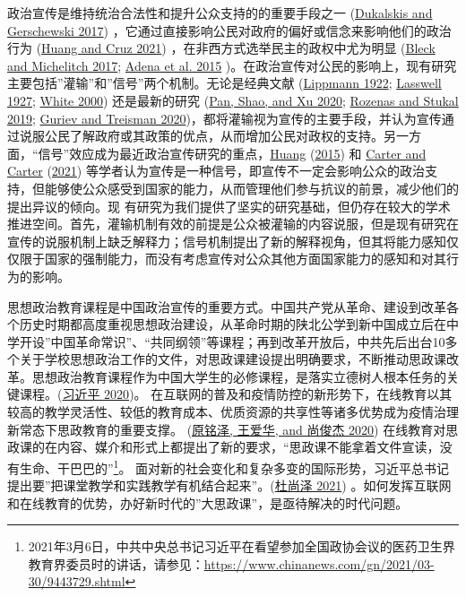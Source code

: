 \documentclass[
  12pt,
]{ctexart}
\begin{document}
政治宣传是维持统治合法性和提升公众支持的的重要手段之一 (\protect\hyperlink{ref-DukalskisGerschewski2017}{Dukalskis and Gerschewski 2017}) ，它通过直接影响公民对政府的偏好或信念来影响他们的政治行为 (\protect\hyperlink{ref-HuangCruz2021}{Huang and Cruz 2021}) ，在非西方式选举民主的政权中尤为明显 (\protect\hyperlink{ref-BleckMichelitch2017}{Bleck and Michelitch 2017}; \protect\hyperlink{ref-AdenaEtAl2015}{Adena et al. 2015} )。在政治宣传对公民的影响上，现有研究主要包括''灌输''和''信号''两个机制。无论是经典文献 (\protect\hyperlink{ref-Lippmann1922}{Lippmann 1922}; \protect\hyperlink{ref-Lasswell1927}{Lasswell 1927}; \protect\hyperlink{ref-White2000}{White 2000}) 还是最新的研究 (\protect\hyperlink{ref-PanEtAl2020}{Pan, Shao, and Xu 2020}; \protect\hyperlink{ref-RozenasStukal2019}{Rozenas and Stukal 2019}; \protect\hyperlink{ref-GurievTreisman2020}{Guriev and Treisman 2020})，都将灌输视为宣传的主要手段，并认为宣传通过说服公民了解政府或其政策的优点，从而增加公民对政权的支持。另一方面，``信号''效应成为最近政治宣传研究的重点，\protect\hyperlink{ref-Huang2015a}{Huang} (\protect\hyperlink{ref-Huang2015a}{2015}) 和 \protect\hyperlink{ref-CarterCarter2021}{Carter and Carter} (\protect\hyperlink{ref-CarterCarter2021}{2021}) 等学者认为宣传是一种信号，即宣传不一定会影响公众的政治支持，但能够使公众感受到国家的能力，从而管理他们参与抗议的前景，减少他们的提出异议的倾向。现
有研究为我们提供了坚实的研究基础，但仍存在较大的学术推进空间。首先，灌输机制有效的前提是公众被灌输的内容说服，但是现有研究在宣传的说服机制上缺乏解释力；信号机制提出了新的解释视角，但其将能力感知仅仅限于国家的强制能力，而没有考虑宣传对公众其他方面国家能力的感知和对其行为的影响。

思想政治教育课程是中国政治宣传的重要方式。中国共产党从革命、建设到改革各个历史时期都高度重视思想政治建设，从革命时期的陕北公学到新中国成立后在中学开设''中国革命常识''、``共同纲领''等课程；再到改革开放后，中共先后出台10多个关于学校思想政治工作的文件，对思政课建设提出明确要求，不断推动思政课改革。思想政治教育课程作为中国大学生的必修课程，是落实立德树人根本任务的关键课程。(\protect\hyperlink{ref-XiJinPing2020}{习近平 2020})。 在互联网的普及和疫情防控的新形势下，在线教育以其较高的教学灵活性、较低的教育成本、优质资源的共享性等诸多优势成为疫情治理新常态下思政教育的重要支撑。 (\protect\hyperlink{ref-YuanMingZeEtAl2020a}{原铭泽, 王爱华, and 尚俊杰 2020}) 在线教育对思政课的在内容、媒介和形式上都提出了新的要求，``思政课不能拿着文件宣读，没有生命、干巴巴的''\footnote{2021年3月6日，中共中央总书记习近平在看望参加全国政协会议的医药卫生界教育界委员时的讲话，请参见：\url{https://www.chinanews.com/gn/2021/03-30/9443729.shtml}}。
面对新的社会变化和复杂多变的国际形势，习近平总书记提出要''把课堂教学和实践教学有机结合起来''。(\protect\hyperlink{ref-DuShangZe2021}{杜尚泽 2021}) 。如何发挥互联网和在线教育的优势，办好新时代的''大思政课''，是亟待解决的时代问题。
\end{document}

